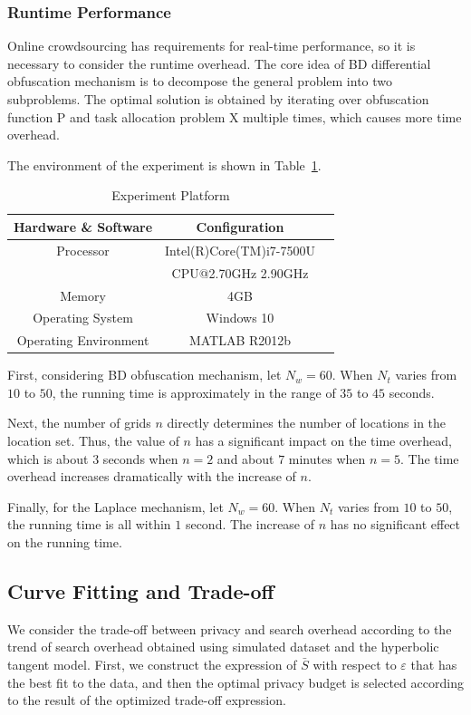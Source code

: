 \subsubsection{Runtime Performance}
Online crowdsourcing has requirements for real-time performance, so it is necessary to consider the runtime overhead. The core idea of BD differential obfuscation mechanism is to decompose the general problem into two subproblems. The optimal solution is obtained by iterating over obfuscation function P and task allocation problem X multiple times, which causes more time overhead.

The environment of the experiment is shown in Table~\ref{tab:envi}.
\begin{table}
  \caption{Experiment Platform}
  \label{tab:envi}
  \begin{tabular}{ccl}
    \toprule
    Hardware \& Software & Configuration\\
    \midrule
    Processor & Intel(R)Core(TM)i7-7500U \\
              & CPU@2.70GHz 2.90GHz\\
    Memory & 4GB\\
    Operating System & Windows 10\\
    Operating Environment & MATLAB R2012b\\
  \bottomrule
\end{tabular}
\end{table}

First, considering BD obfuscation mechanism, let $N_w=60$. When $N_t$ varies from $10$ to $50$, the running time is approximately in the range of $35$ to $45$ seconds.

Next, the number of grids $n$ directly determines the number of locations in the location set. Thus, the value of $n$ has a significant impact on the time overhead, which is about $3$ seconds when $n=2$ and about $7$ minutes when $n=5$. The time overhead increases dramatically with the increase of $n$.

Finally, for the Laplace mechanism, let $N_w=60$. When $N_t$ varies from $10$ to $50$, the running time is all within $1$ second. The increase of $n$ has no significant effect on the running time.

\subsection{Curve Fitting and Trade-off} %
We consider the trade-off between privacy and search overhead according to the trend of search overhead obtained using simulated dataset and the hyperbolic tangent model. First, we construct the expression of $\bar{S}$ with respect to $\varepsilon$ that has the best fit to the data, and then the optimal privacy budget is selected according to the result of the optimized trade-off expression.

